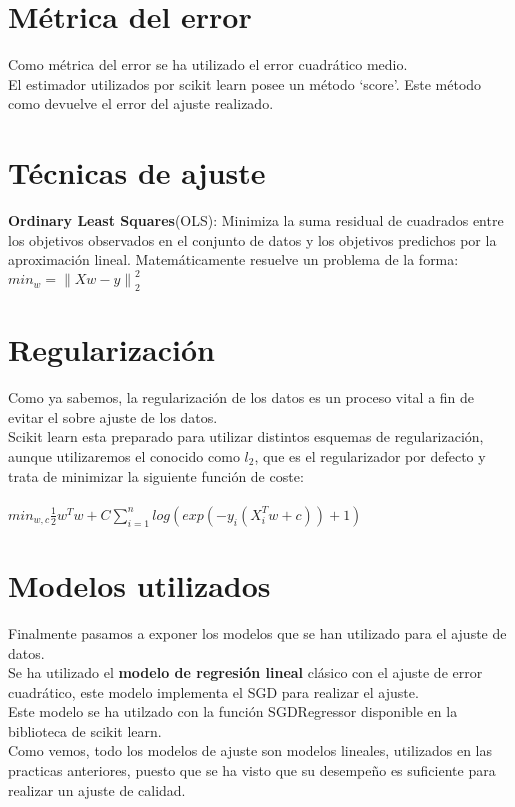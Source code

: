 \section{Métrica del error}
Como métrica del error se ha utilizado el error cuadrático medio.\\
El estimador utilizados por scikit learn \cite{SGDRegressor} posee un método `score'. Este método como devuelve el error del ajuste realizado.\\

\section{Técnicas de ajuste}
\textbf{Ordinary Least Squares}(OLS): Minimiza la suma residual de cuadrados entre los objetivos observados en el conjunto de datos y los objetivos predichos por la aproximación lineal. Matemáticamente resuelve un problema de la forma: $ min_w = \left \| Xw - y \right \|^{2}_{2} $ \cite{linearmodels}


\section{Regularización}
Como ya sabemos, la regularización de los datos es un proceso vital a fin de evitar el sobre ajuste de los datos.\\
Scikit learn esta preparado para utilizar distintos esquemas de regularización, aunque utilizaremos el conocido como $l_2$, que es el regularizador por defecto y trata de minimizar la siguiente función de coste:\\\\
$min_{w,c} \frac{1}{2} w^T w + C \sum_{i=1}^{n}log(exp(-y_i(X^T_iw+c))+1)$ \cite{linearmodels}\\

\section{Modelos utilizados}
Finalmente pasamos a exponer los modelos que se han utilizado para el ajuste de datos.
\\Se ha utilizado el \textbf{modelo de regresión lineal} clásico con el ajuste de error cuadrático, este modelo implementa el SGD para realizar el ajuste.
\\
Este modelo se ha utilzado con la función SGDRegressor\cite{SGDRegressor} disponible en la biblioteca de scikit learn.\\
Como vemos, todo los modelos de ajuste son modelos lineales, utilizados en las practicas anteriores, puesto que se ha visto que su desempeño es suficiente para realizar un ajuste de calidad.

